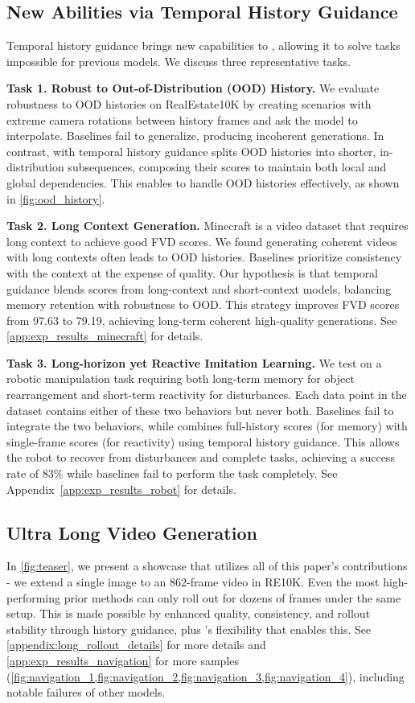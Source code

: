 \subsection{New Abilities via Temporal History Guidance}
\label{sec:exp_temporal_guidance}

Temporal history guidance brings new capabilities to \mtd, allowing it to solve tasks impossible for previous models. We discuss three representative tasks.

\textbf{Task 1. Robust to Out-of-Distribution (OOD) History.} 
We evaluate robustness to OOD histories on RealEstate10K by creating scenarios with extreme camera rotations between history frames and ask the model to interpolate. Baselines fail to generalize, producing incoherent generations. In contrast, \mtd with temporal history guidance splits OOD histories into shorter, in-distribution subsequences, composing their scores to maintain both local and global dependencies. This enables \mtd to handle OOD histories effectively, as shown in \cref{fig:ood_history}.

\textbf{Task 2. Long Context Generation.}
Minecraft is a video dataset that requires long context to achieve good FVD scores. We found generating coherent videos with long contexts often leads to OOD histories. Baselines prioritize consistency with the context at the expense of quality. Our hypothesis is that temporal guidance blends scores from long-context and short-context models, balancing memory retention with robustness to OOD. This strategy improves FVD scores from 97.63 to 79.19, achieving long-term coherent high-quality generations. See \cref{app:exp_results_minecraft} for details.


\textbf{Task 3. Long-horizon yet Reactive Imitation Learning.}
We test on a robotic manipulation task requiring both long-term memory for object rearrangement and short-term reactivity for disturbances. Each data point in the dataset contains either of these two behaviors but never both. Baselines fail to integrate the two behaviors, while \mtd combines full-history scores (for memory) with single-frame scores (for reactivity) using temporal history guidance. This allows the robot to recover from disturbances and complete tasks, achieving a success rate of 83\% while baselines fail to perform the task completely. See Appendix~\ref{app:exp_results_robot} for details.

\subsection{Ultra Long Video Generation}
\label{sec:exp_long_navigation}
In \cref{fig:teaser}, we present a showcase that utilizes all of this paper's contributions - we extend a single image to an 862-frame video in RE10K. Even the most high-performing prior methods can only roll out for dozens of frames under the same setup. This is made possible by enhanced quality, consistency, and rollout stability through history guidance, plus \mtd's flexibility that enables this. See \cref{appendix:long_rollout_details} for more details and \cref{app:exp_results_navigation} for more samples (\cref{fig:navigation_1,fig:navigation_2,fig:navigation_3,fig:navigation_4}), including notable failures of other models.
